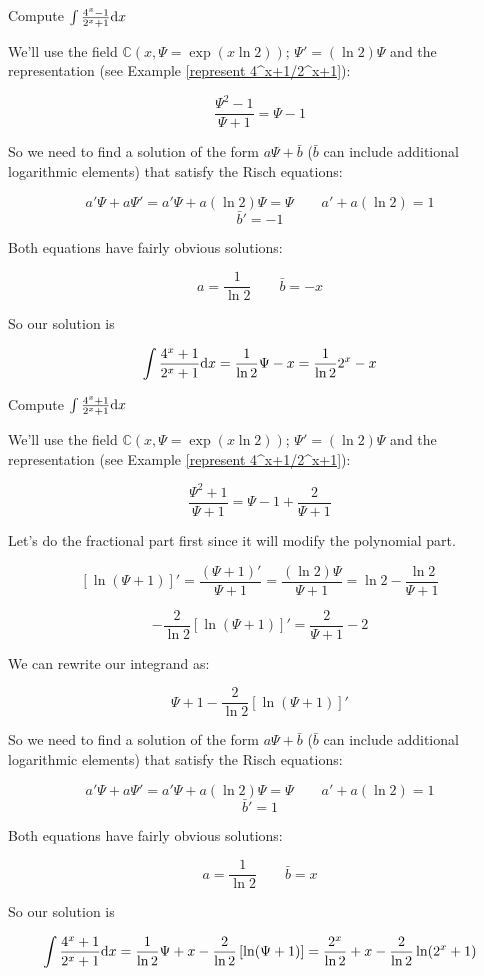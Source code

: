 \example Compute $\int {{4^x-1}\over{2^x+1}} {\rm d}x$
\label{integrate 4^x-1/2^x+1}

We'll use the field ${\mathbb C}(x,\Psi = \exp(x \ln 2))$; $\Psi' =
(\ln 2)\Psi$ and the representation (see Example
\ref{represent 4^x+1/2^x+1}):

$$ \frac{\Psi^2-1}{\Psi+1} = \Psi-1$$

So we need to find a solution of the form $a\Psi + \bar{b}$ ($\bar{b}$
can include additional logarithmic elements) that satisfy the Risch
equations:

$$a'\Psi + a\Psi' = a'\Psi + a(\ln 2)\Psi = \Psi \qquad a' + a(\ln 2) = 1$$
$$\bar{b}' = -1$$

Both equations have fairly obvious solutions:

$$a = \frac{1}{\ln 2} \qquad \bar{b}=-x$$

So our solution is

$$\int {{4^x+1}\over{2^x+1}} {\rm d}x = \frac{1}{\ln 2}\Psi - x =
\frac{1}{\ln 2}2^x - x$$

\endexample


\vfil\eject

\example Compute $\int {{4^x+1}\over{2^x+1}} {\rm d}x$
\label{integrate 4^x+1/2^x+1}

We'll use the field ${\mathbb C}(x,\Psi = \exp(x \ln 2))$; $\Psi' =
(\ln 2)\Psi$ and the representation (see Example
\ref{represent 4^x+1/2^x+1}):

$$ \frac{\Psi^2+1}{\Psi+1} = \Psi-1+\frac{2}{\Psi+1}$$

Let's do the fractional part first since it will modify the polynomial
part.

$$\left[\ln(\Psi+1)\right]' = \frac{(\Psi + 1)'}{\Psi+1} = \frac{(\ln
2)\Psi}{\Psi + 1} = \ln 2 - \frac{\ln 2}{\Psi+1}$$

$$-\frac{2}{\ln 2}\left[\ln(\Psi+1)\right]' = \frac{2}{\Psi+1} - 2$$

We can rewrite our integrand as:

$$ \Psi + 1 - \frac{2}{\ln 2}\left[\ln(\Psi+1)\right]'$$

So we need to find a solution of the form $a\Psi + \bar{b}$ ($\bar{b}$
can include additional logarithmic elements) that satisfy the Risch
equations:

$$a'\Psi + a\Psi' = a'\Psi + a(\ln 2)\Psi = \Psi \qquad a' + a(\ln 2) = 1$$
$$\bar{b}' = 1$$

Both equations have fairly obvious solutions:

$$a = \frac{1}{\ln 2} \qquad \bar{b}=x$$

So our solution is

$$\int {{4^x+1}\over{2^x+1}} {\rm d}x = \frac{1}{\ln 2}\Psi + x  - \frac{2}{\ln 2}\left[\ln(\Psi+1)\right] =
\frac{2^x}{\ln 2} + x - \frac{2}{\ln 2}\ln(2^x+1) $$

\endexample
